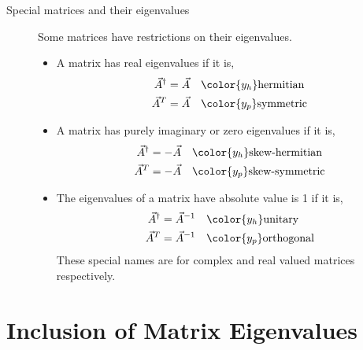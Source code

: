 \begin{description}
    \item[Special matrices and their eigenvalues] Some matrices have restrictions on
        their eigenvalues.
        \begin{itemize}
            \item A matrix has real eigenvalues if it is,
                  \begin{align}
                      \vec{A}^\dag & = \vec{A}                   &
                                   & \color{y_h}\text{hermitian}   \\
                      \vec{A}^T    & = \vec{A}                   &
                                   & \color{y_p}\text{symmetric}
                  \end{align}
            \item A matrix has purely imaginary or zero eigenvalues if it is,
                  \begin{align}
                      \vec{A}^\dag & = -\vec{A}                       &
                                   & \color{y_h}\text{skew-hermitian}   \\
                      \vec{A}^T    & = -\vec{A}                       &
                                   & \color{y_p}\text{skew-symmetric}
                  \end{align}
            \item The eigenvalues of a matrix have absolute value is 1 if it is,
                  \begin{align}
                      \vec{A}^\dag & = \vec{A}^{-1}               &
                                   & \color{y_h}\text{unitary}      \\
                      \vec{A}^T    & = \vec{A}^{-1}               &
                                   & \color{y_p}\text{orthogonal}
                  \end{align}
                  These special names are for \textcolor{y_h}{complex} and
                  \textcolor{y_p}{real} valued matrices respectively.
        \end{itemize}
\end{description}

\section{Inclusion of Matrix Eigenvalues}


